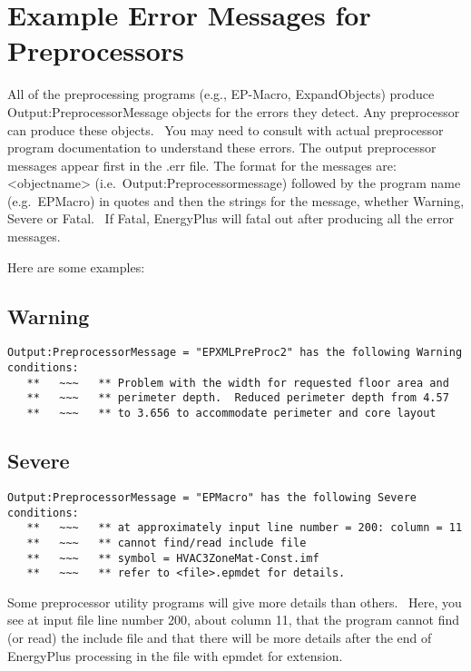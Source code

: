 \section{Example Error Messages for Preprocessors}\label{example-error-messages-for-preprocessors}

All of the preprocessing programs (e.g., EP-Macro, ExpandObjects) produce Output:PreprocessorMessage objects for the errors they detect. Any preprocessor can produce these objects.~ You may need to consult with actual preprocessor program documentation to understand these errors. The output preprocessor messages appear first in the .err file. The format for the messages are: \textless{}objectname\textgreater{} (i.e.~Output:Preprocessormessage) followed by the program name (e.g.~EPMacro) in quotes and then the strings for the message, whether Warning, Severe or Fatal.~ If Fatal, EnergyPlus will fatal out after producing all the error messages.

Here are some examples:

\subsection{Warning}\label{warning-000}

\begin{lstlisting}
Output:PreprocessorMessage = "EPXMLPreProc2" has the following Warning conditions:
   **   ~~~   ** Problem with the width for requested floor area and
   **   ~~~   ** perimeter depth.  Reduced perimeter depth from 4.57
   **   ~~~   ** to 3.656 to accommodate perimeter and core layout
\end{lstlisting}

\subsection{Severe}\label{severe-000}

\begin{lstlisting}
Output:PreprocessorMessage = "EPMacro" has the following Severe conditions:
   **   ~~~   ** at approximately input line number = 200: column = 11
   **   ~~~   ** cannot find/read include file
   **   ~~~   ** symbol = HVAC3ZoneMat-Const.imf
   **   ~~~   ** refer to <file>.epmdet for details.
\end{lstlisting}

Some preprocessor utility programs will give more details than others.~ Here, you see at input file line number 200, about column 11, that the program cannot find (or read) the include file and that there will be more details after the end of EnergyPlus processing in the file with epmdet for extension.

